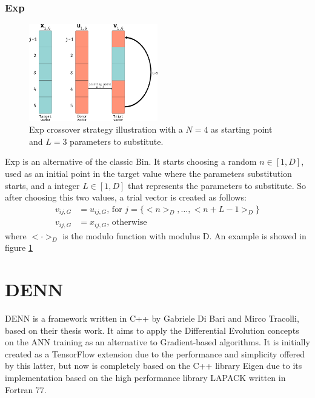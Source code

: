 \subsubsection{Exp}
\begin{figure}[h!]
	\centering
	\includegraphics[width=0.5\textwidth]{figures/de-exp.png}
	\caption{Exp crossover strategy illustration with a $N = 4$ as starting point and $L = 3$ parameters to substitute.}
	\label{fig:exp-crossover}
\end{figure}
Exp is an alternative of the classic Bin. It starts choosing a random $n \in [1, D]$, used as an initial point in the target value where the parameters substitution starts, and a integer $L \in [1, D]$ that represents the parameters to substitute. So after choosing this two values, a trial vector is created as follows:
\begin{align}
	v_{ij, G} &= u_{ij, G}\textrm{,  for } j = \{<n>_{D}, \dots, <n + L - 1>_{D}\} \\
	v_{ij, G} &= x_{ij, G}\textrm{,  otherwise}
\end{align} 
where $< \cdot >_{D}$ is the modulo function with modulus D. An example is showed in figure \ref{fig:exp-crossover}

\section{DENN}\label{sec:DENN}
DENN is a framework written in C++ by Gabriele Di Bari and Mirco Tracolli, based on their thesis work. It aims to apply the Differential Evolution concepts on the ANN training as an alternative to Gradient-based algorithms. It is initially created as a TensorFlow extension due to the performance and simplicity offered by this latter, but now is completely based on the C++ library Eigen due to its implementation based on the high performance library LAPACK written in Fortran 77.

